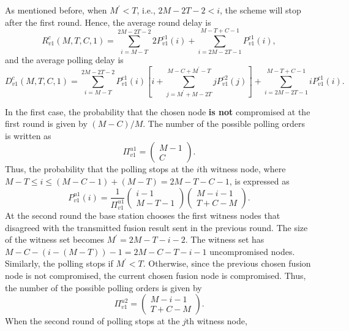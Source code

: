 \documentclass[12pt, onecolumn, draftcls]{IEEEtran}
\begin{document}
As mentioned before, when $M^{\prime}<T$, i.e., $2M-2T-2<i$, the
scheme will stop after the first round. Hence, the average round
delay is
\begin{equation}
R_{v1}^c(M,T,C,1) = \sum_{i=M-T}^{2M-2T-2} 2P_{v1}^{c1}(i)
 + \sum_{i=2M-2T-1}^{M-T+C-1}P_{v1}^{c1}(i),
\label{eqn:polling_invalid_compromised_round_delay1}
\end{equation}
and the average polling delay is
\begin{equation}
D_{v1}^c(M,T,C,1) = \sum_{i=M-T}^{2M-2T-2}P_{v1}^{c1}(i)
\left[i+\sum_{j=M^{\prime}+M-2T}^{M-C+ M^{\prime}-T}jP_{v1}^{c2}(j)
\right]
 + \sum_{i=2M-2T-1}^{M-T+C-1}iP_{v1}^{c1}(i).
\label{eqn:polling_invalid_compromised_polling_delay1}
\end{equation}

 In the first case, the probability
that the chosen node {\bf is not} compromised at the first round is
given by $(M-C)/M$. The number of the possible polling orders is
written as
\[
\Pi_{v1}^{u1} = \left(\begin{array}{c} M-1 \\ C \end{array}\right).
\]
Thus, the probability that the polling stops at the $i$th witness
node, where $M-T \le i \le (M-C-1)+(M-T)=2M-T-C-1$, is expressed as
\begin{equation*}
P_{v1}^{u1}(i)=\frac{1}{\Pi_{v1}^{u1}}\left(\begin{array}{c} i-1 \\
M-T-1
\end{array}\right) \left(\begin{array}{c} M-i-1 \\ T+C-M
\end{array}\right).
\end{equation*}
At the second round the base station chooses the first witness nodes
that disagreed with the transmitted fusion result sent in the
previous round. The size of the witness set becomes
$M^{\prime}=2M-T-i-2$. The witness set has $M-C-(i-(M-T))-1 =
2M-C-T-i-1$ uncompromised nodes. Similarly, the polling stops if
$M^{\prime}<T$. Otherwise, since the previous chosen fusion node is
not compromised, the current chosen fusion node is compromised.
Thus, the number of the possible polling orders is given by
\[
\Pi_{v1}^{u2} = \left(\begin{array}{c} M-i-1 \\ T+C-M
\end{array}\right).
\]
When the second round of polling stops at the $j$th witness node,
\end{document}
